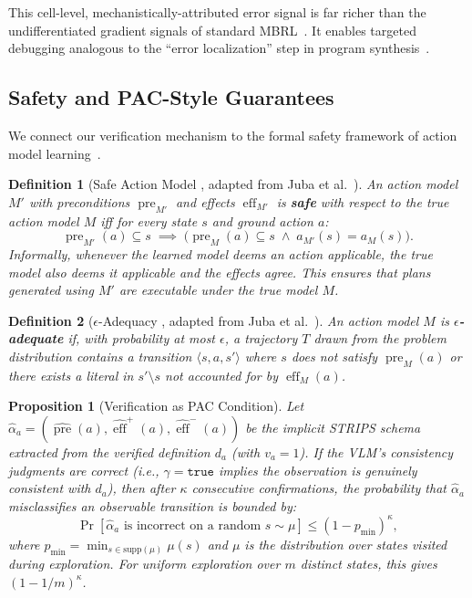 \documentclass{article}
\newtheorem{definition}{Definition}
\newtheorem{proposition}{Proposition}
\DeclareMathOperator{\pre}{pre}
\DeclareMathOperator{\eff}{eff}
\begin{document}
This cell-level, mechanistically-attributed error signal is far richer than the undifferentiated gradient signals of standard MBRL~\cite{hafner2020dreamer}.  It enables targeted debugging analogous to the ``error localization'' step in program synthesis~\cite{gulwani2017program}.

\subsection{Safety and PAC-Style Guarantees}
\label{sec:pac_guarantees}

We connect our verification mechanism to the formal safety framework of action model learning~\cite{juba2021safe, le2024pisam, mordoch2024csam}.

\begin{definition}[Safe Action Model ,  adapted from Juba et al.~\cite{juba2021safe}]
\label{def:safe_action_model}
An action model $M'$ with preconditions $\pre_{M'}$ and effects $\eff_{M'}$ is \textbf{safe} with respect to the true action model $M$ iff for every state $s$ and ground action $a$:
\begin{equation}
\pre_{M'}(a) \subseteq s \;\implies\; \bigl(\pre_M(a) \subseteq s \;\wedge\; a_{M'}(s) = a_M(s)\bigr).
\end{equation}
Informally, whenever the learned model deems an action applicable, the true model also deems it applicable and the effects agree.  This ensures that plans generated using $M'$ are \emph{executable} under the true model $M$.
\end{definition}

\begin{definition}[$\epsilon$-Adequacy ,  adapted from Juba et al.~\cite{juba2021safe}]
\label{def:adequate}
An action model $M$ is \textbf{$\epsilon$-adequate} if, with probability at most $\epsilon$, a trajectory $T$ drawn from the problem distribution contains a transition $\langle s, a, s' \rangle$ where $s$ does not satisfy $\pre_M(a)$ or there exists a literal in $s' \setminus s$ not accounted for by $\eff_M(a)$.
\end{definition}

\begin{proposition}[Verification as PAC Condition]
\label{prop:pac_verification}
Let $\hat{\alpha}_a = (\widehat{\pre}(a), \widehat{\eff}^+(a), \widehat{\eff}^-(a))$ be the implicit STRIPS schema extracted from the verified definition $d_a$ (with $v_a = 1$).  If the VLM's consistency judgments are correct (i.e., $\gamma = \texttt{true}$ implies the observation is genuinely consistent with $d_a$), then after $\kappa$ consecutive confirmations, the probability that $\hat{\alpha}_a$ misclassifies an observable transition is bounded by:
\begin{equation}
\Pr[\hat{\alpha}_a \text{ is incorrect on a random } s \sim \mu] \leq (1 - p_{\min})^\kappa,
\end{equation}
where $p_{\min} = \min_{s \in \text{supp}(\mu)} \mu(s)$ and $\mu$ is the distribution over states visited during exploration.  For uniform exploration over $m$ distinct states, this gives $(1 - 1/m)^\kappa$.
\end{proposition}
\end{document}

